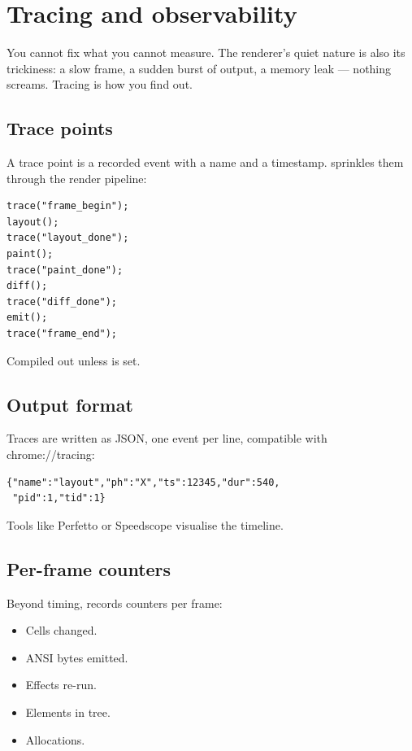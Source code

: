 \chapter{Tracing and observability}
\label{ch:tracing}

\begin{aside}
You cannot fix what you cannot measure. The renderer's quiet
nature is also its trickiness: a slow frame, a sudden burst of
output, a memory leak --- nothing screams. Tracing is how you
find out.
\end{aside}

\section{Trace points}

A trace point is a recorded event with a name and a timestamp.
\maya{} sprinkles them through the render pipeline:

\begin{lstlisting}
trace("frame_begin");
layout();
trace("layout_done");
paint();
trace("paint_done");
diff();
trace("diff_done");
emit();
trace("frame_end");
\end{lstlisting}

Compiled out unless  is set.

\section{Output format}

Traces are written as JSON, one event per line, compatible
with chrome://tracing:

\begin{lstlisting}
{"name":"layout","ph":"X","ts":12345,"dur":540,
 "pid":1,"tid":1}
\end{lstlisting}

Tools like Perfetto or Speedscope visualise the timeline.

\section{Per-frame counters}

Beyond timing, \maya{} records counters per frame:

\begin{itemize}[leftmargin=*]
  \item Cells changed.
  \item ANSI bytes emitted.
  \item Effects re-run.
  \item Elements in tree.
  \item Allocations.
\end{itemize}


